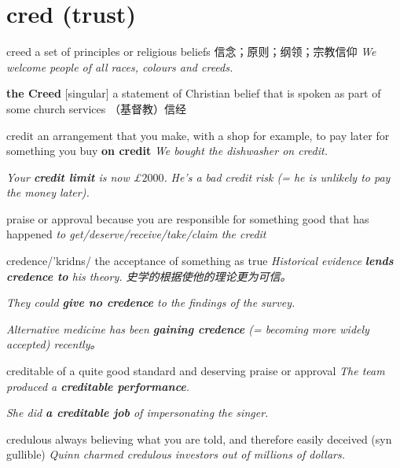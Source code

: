 \section{cred (trust)}

\begin{DefWord}{creed}
    a set of principles or religious beliefs 信念；原则；纲领；宗教信仰
    \textit{We welcome people of all races, colours and creeds.}

    \textbf{the Creed} [singular] a statement of Christian belief that is spoken as part of some church services （基督教）信经
\end{DefWord}

\begin{DefWord}{credit}
    an arrangement that you make, with a shop for example, to pay later for something you buy
    \textbf{on credit} \textit{We bought the dishwasher on credit.}

    \textit{Your \textbf{credit limit} is now \pounds$2 000$.}
    \textit{He's a bad credit risk (= he is unlikely to pay the money later).}

    praise or approval because you are responsible for something good that has happened
    \textit{to get/deserve/receive/take/claim the credit}
\end{DefWord}

\begin{DefWord}{credence}/'kridns/
    the acceptance of something as true
    \textit{Historical evidence \textbf{lends credence to} his theory. 史学的根据使他的理论更为可信。}

    \textit{They could \textbf{give no credence} to the findings of the survey.}

    \textit{Alternative medicine has been \textbf{gaining credence} (= becoming more widely accepted) recently。}
\end{DefWord}

\begin{DefWord}{creditable}
    of a quite good standard and deserving praise or approval
    \textit{The team produced a \textbf{creditable performance}.}

    \textit{She did \textbf{a creditable job} of impersonating the singer.}
\end{DefWord}

\begin{DefWord}{credulous}
    always believing what you are told, and therefore easily deceived (syn gullible)
    \textit{Quinn charmed credulous investors out of millions of dollars.}
\end{DefWord}

